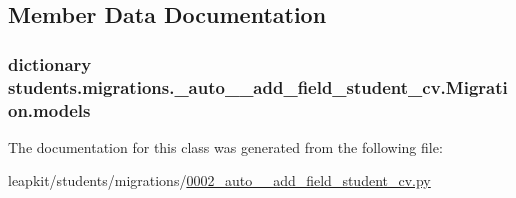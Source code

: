 \subsection{Member Data Documentation}
\hypertarget{classstudents_1_1migrations_1_10002__auto____add__field__student__cv_1_1_migration_a341e15c4f0ea5a07c66d93d02d3fb464}{
\subsubsection[{models}]{\setlength{\rightskip}{0pt plus 5cm}dictionary students.\-migrations.\-\_\-auto\-\_\-\-\_\-add\-\_\-field\-\_\-student\-\_\-cv.\-Migration.\-models\hspace{0.3cm}{\ttfamily [static]}}}\label{classstudents_1_1migrations_1_10002__auto____add__field__student__cv_1_1_migration_a341e15c4f0ea5a07c66d93d02d3fb464}


The documentation for this class was generated from the following file\-:\begin{DoxyCompactItemize}
\item 
leapkit/students/migrations/\hyperlink{0002__auto____add__field__student__cv_8py}{0002\-\_\-auto\-\_\-\-\_\-add\-\_\-field\-\_\-student\-\_\-cv.\-py}\end{DoxyCompactItemize}
